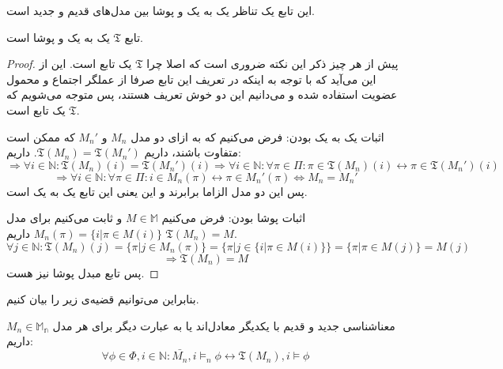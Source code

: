 این تابع یک تناظر یک به یک و پوشا بین مدل‌های قدیم و جدید است. 
\begin{thm}
	تابع $\mathfrak{T}$ یک به یک و پوشا است.
\end{thm}
\begin{proof}
	پیش از هر چیز ذکر این نکته ضروری است که اصلا چرا $\mathfrak{T}$ یک تابع است. این از این می‌آید که با توجه به اینکه در تعریف این تابع صرفا از عملگر اجتماع و محمول عضویت استفاده شده و می‌دانیم این دو خوش تعریف هستند، پس متوجه می‌شویم که $\mathfrak{T}$ یک تابع است.
	
	اثبات یک به یک بودن:
	فرض می‌‌کنیم که به ازای دو مدل $M_n$ و $M_n'$ که ممکن است متفاوت باشند، داریم $\mathfrak{T}(M_n)=\mathfrak{T}(M_n')$. داریم:
	$$\Rightarrow \forall i \in \mathbb{N}: \mathfrak{T}(M_n)(i)=\mathfrak{T}(M_n')(i)
	\Rightarrow \forall i \in \mathbb{N}: \forall \pi \in \Pi: \pi \in \mathfrak{T}(M_n)(i) \leftrightarrow \pi \in \mathfrak{T}(M_n')(i)$$
	$$\Rightarrow \forall i \in \mathbb{N}: \forall \pi \in \Pi: i \in M_n(\pi) \leftrightarrow \pi \in M_n'(\pi) \iff M_n = M_n'$$
	پس این دو مدل الزاما برابرند و این یعنی این تابع یک به یک است.
	
	اثبات پوشا بودن: فرض می‌کنیم $M \in \mathbb{M}$ و ثابت می‌کنیم برای مدل \break
	$M_n (\pi)=\{i | \pi \in M(i)\}$ 
	داریم $\mathfrak{T}(M_n)=M$.
	$$\forall j \in \mathbb{N}: \mathfrak{T}(M_n)(j)=\{\pi | j \in M_n(\pi)\}
	=\{\pi | j \in \{i | \pi \in M(i)\}\}= \{\pi | \pi \in M(j)\}=M(j)$$
	$$\Rightarrow \mathfrak{T}(M_n)=M$$
	پس تابع مبدل پوشا نیز هست.
\end{proof}

بنابراین می‌توانیم قضیه‌ی زیر را بیان کنیم.
\begin{thm}
	معناشناسی جدید و قدیم با یکدیگر معادل‌اند یا به عبارت دیگر 
	برای هر مدل $M_n \in \mathbb{M_n}$ داریم:
	$$\forall \phi \in \Phi, i\in\mathbb{N}:\bar{M_n},i \models_n \phi \leftrightarrow \mathfrak{T}(M_n) , i \models \phi $$
\end{thm}

